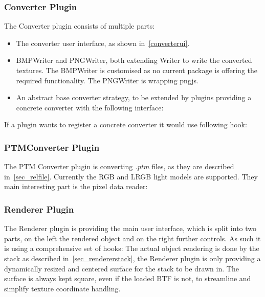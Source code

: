 \subsubsection{Converter Plugin}
The Converter plugin consists of multiple parts:
\begin{itemize}
\item The converter user interface, as shown in~\autoref{converterui}.
\item BMPWriter and PNGWriter, both extending Writer to write the converted
  textures. The BMPWriter is customised as no current package is offering the
  required functionality. The PNGWriter is wrapping pngjs.
\item An abstract base converter strategy, to be extended by plugins providing a
  concrete converter with the following interface:
\end{itemize}
If a plugin wants to register a concrete converter it would use following hook:

\subsubsection{PTMConverter Plugin}\label{sec_ptmconverter}
The PTM Converter plugin is converting \emph{.ptm} files, as they are described
in~\autoref{sec_relfile}. Currently the RGB and LRGB light models are
supported. They main interesting part is the pixel data reader:

\subsubsection{Renderer Plugin}
The Renderer plugin is providing the main user interface, which is split into
two parts, on the left the rendered object and on
the right further controls. As such it is using a comprehensive set of hooks:
The actual object rendering is done by the stack as described
in~\autoref{sec_rendererstack}, the Renderer plugin is only providing a
dynamically resized and centered surface for the stack to be drawn in. The
surface is always kept square, even if the loaded BTF is not, to streamline and
simplify texture coordinate handling.

